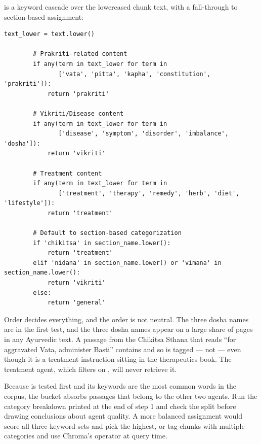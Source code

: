  is a keyword cascade over the lowercased chunk text, with a fall-through to section-based assignment:

\begin{lstlisting}[style=py,firstnumber=226]
        text_lower = text.lower()

        # Prakriti-related content
        if any(term in text_lower for term in
               ['vata', 'pitta', 'kapha', 'constitution', 'prakriti']):
            return 'prakriti'

        # Vikriti/Disease content
        if any(term in text_lower for term in
               ['disease', 'symptom', 'disorder', 'imbalance', 'dosha']):
            return 'vikriti'

        # Treatment content
        if any(term in text_lower for term in
               ['treatment', 'therapy', 'remedy', 'herb', 'diet', 'lifestyle']):
            return 'treatment'

        # Default to section-based categorization
        if 'chikitsa' in section_name.lower():
            return 'treatment'
        elif 'nidana' in section_name.lower() or 'vimana' in section_name.lower():
            return 'vikriti'
        else:
            return 'general'
\end{lstlisting}

Order decides everything, and the order is not neutral. The three dosha names are in the first test, and the three dosha names appear on a large share of pages in any Ayurvedic text. A passage from the Chikitsa Sthana that reads ``for aggravated Vata, administer Basti'' contains  and so is tagged  --- not  --- even though it is a treatment instruction sitting in the therapeutics book. The treatment agent, which filters on , will never retrieve it.

\begin{bug}[title={Consequence: the treatment corpus is smaller than it looks}]
Because  is tested first and its keywords are the most common words in the corpus, the  bucket absorbs passages that belong to the other two agents. Run the category breakdown printed at the end of step 1 and check the split before drawing conclusions about agent quality. A more balanced assignment would score all three keyword sets and pick the highest, or tag chunks with multiple categories and use Chroma's  operator at query time.
\end{bug}

